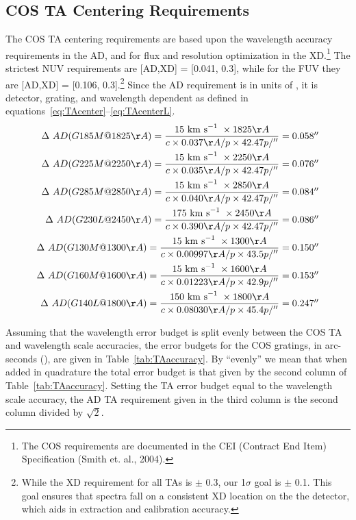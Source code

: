 \subsection{COS TA Centering Requirements}\label{subsec:requirements}

The COS TA centering requirements are based upon the wavelength accuracy requirements in the AD, and for flux and resolution optimization
in the XD.\footnote{The COS requirements are documented in the CEI (Contract End Item) Specification (Smith et. al., 2004).} The strictest NUV requirements are [AD,XD] = [0.041, 0.3]\arcsec, while for the FUV they are [AD,XD] = [0.106, 0.3]\arcsec.\footnote{While the XD requirement for all TAs is $\pm$ 0.3\arcsec, our 1$\sigma$ goal is $\pm$ 0.1\arcsec. This goal ensures that spectra fall on a consistent XD location on the the detector, which aids in extraction and calibration accuracy.}
Since the AD requirement is in units of \kmsno, it is detector, grating, and wavelength dependent as defined in equations~\ref{eq:TAcenter}--\ref{eq:TAcenterL}.
\small
\begin{eqnarray}\label{eq:TAcenter}
\Delta\ AD(G185M@1825\AA) = {{ 15\kms \times 1825\AA}\over{c \times 0 .037\AA/p\times 42.47 p/\arcsec}}  = 0.058\arcsec\\
\Delta\ AD(G225M@2250\AA) = {{ 15\kms \times 2250\AA}\over{c \times  0.035\AA/p\times 42.47 p/\arcsec}}  = 0.076\arcsec\\
\Delta\ AD(G285M@2850\AA) = {{ 15\kms \times 2850\AA}\over{c \times  0.040\AA/p\times 42.47 p/\arcsec}}  = 0.084\arcsec\\
\Delta\ AD(G230L@2450\AA) = {{175\kms \times 2450\AA}\over{c \times  0.390\AA/p\times 42.47 p/\arcsec}}  = 0.086\arcsec\\
\Delta\ AD(G130M@1300\AA) = {{ 15\kms \times 1300\AA}\over{c \times 0.00997\AA/ p\times 43.5 p/\arcsec}} = 0.150\arcsec\\
\Delta\ AD(G160M@1600\AA) = {{ 15\kms \times 1600\AA}\over{c \times 0.01223\AA/ p\times 42.9 p/\arcsec}} = 0.153\arcsec\\
\Delta\ AD(G140L@1800\AA) = {{150\kms \times 1800\AA}\over{c \times 0.08030\AA/ p\times 45.4 p/\arcsec}} = 0.247\arcsec\label{eq:TAcenterL}
\end{eqnarray}
\normalsize

Assuming that the wavelength error budget is split evenly between the COS TA and wavelength scale accuracies,
the error budgets for the COS gratings, in arc-seconds (\arcsec), are given in Table~\ref{tab:TAaccuracy}. By ``evenly'' we mean that when added in quadrature the total error budget is that given by the second column of Table~\ref{tab:TAaccuracy}.
Setting the TA error budget equal to the wavelength scale accuracy, the AD TA requirement given in the third column is the second column divided by $\sqrt{2}$.
